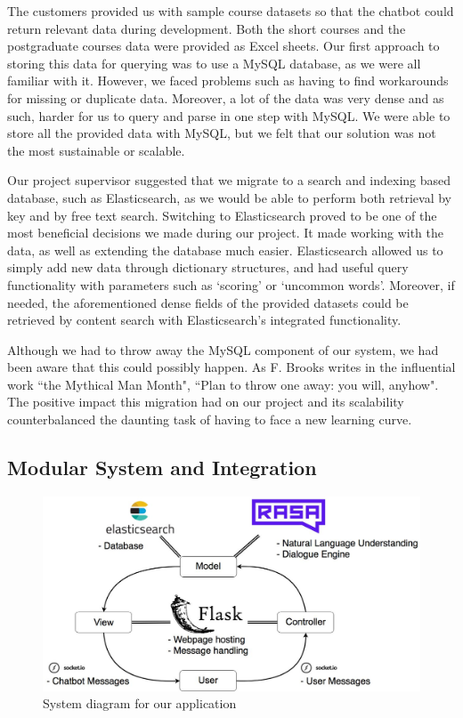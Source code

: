 \documentclass{l3proj}
\begin{document}
The customers provided us with sample course datasets so that the chatbot could return relevant data during development. Both the short courses and the postgraduate courses data were provided as Excel sheets. Our first approach to storing this data for querying was to use a MySQL database, as we were all familiar with it. However, we faced problems such as having to find workarounds for missing or duplicate data. Moreover, a lot of the data was very dense and as such, harder for us to query and parse in one step with MySQL. We were able to store all the provided data with MySQL, but we felt that our solution was not the most sustainable or scalable.

Our project supervisor suggested that we migrate to a search and indexing based database, such as Elasticsearch, as we would be able to perform both retrieval by key and by free text search. Switching to Elasticsearch proved to be one of the most beneficial decisions we made during our project. It made working with the data, as well as extending the database much easier. Elasticsearch allowed us to simply add new data through dictionary structures, and had useful query functionality with parameters such as `scoring' or `uncommon words'. Moreover, if needed, the aforementioned dense fields of the provided datasets could be retrieved by content search with Elasticsearch's integrated functionality\cite{elasticsearch}.

Although we had to throw away the MySQL component of our system, we had been aware that this could possibly happen. As F. Brooks writes in the influential work ``the Mythical Man Month",  ``Plan to throw one away: you will, anyhow"\cite{manmonth:Brooks}. The positive impact this migration had on our project and its scalability counterbalanced the daunting task of having to face a new learning curve.

\subsection{Modular System and Integration}

\begin{figure}[h!]
    \centering
    \includegraphics[width=0.75\linewidth]{figures/MVC.jpg}
    \caption{System diagram for our application}
    \label{fig:mvc}
\end{figure}
\end{document}
